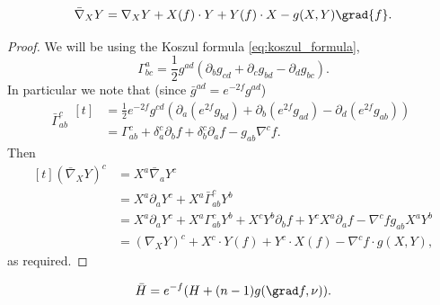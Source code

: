 \documentclass[titlepage,numbers=noenddot,headinclude,oneside,%
footinclude=true,cleardoublepage=empty,%
BCOR=5mm,paper=a4,fontsize=11pt,%
english,%
]{scrartcl}
\begin{document}
\begin{lemma}\label{lem:conformal_change_connection}
    \begin{equation*}
        \bar{\nabla}_X Y =\nabla_X Y+X(f)\cdot Y+Y(f)\cdot X-g(X,Y)\grad{f}.
    \end{equation*}
\end{lemma}
\begin{proof}
    We will be using the Koszul formula \cref{eq:koszul_formula},
    \begin{equation*}
        \Gamma^a_{bc}=\frac{1}{2}g^{ad}(\partial_b g_{cd}+\partial_c g_{bd}-\partial_d g_{bc}).
    \end{equation*}
    In particular we note that (since \( \bar{g}^{ad}=e^{-2f}g^{ad} \))
    \begin{equation*}
        \bar{\Gamma}^c_{ab}\begin{aligned}[t]
            &=\frac{1}{2}e^{-2f}g^{cd}(\partial_a(e^{2f}g_{bd})+\partial_b(e^{2f}g_{ad})-\partial_d(e^{2f}g_{ab}))\\
            &=\Gamma^c_{ab}+\delta^c_a\partial_b f +\delta^c_b\partial_a f-g_{ab}\nabla^c f.
        \end{aligned}
    \end{equation*}
    Then
    \begin{equation*}
        \begin{aligned}[t]
            (\bar{\nabla}_X Y)^c&=X^a \bar{\nabla}_a Y^c\\
            &=X^a \partial_a Y^c + X^a\bar{\Gamma}_{ab}^c  Y^b\\
            &=X^a \partial_a Y^c +X^a \Gamma_{ab}^c Y^b+X^c Y^b \partial_b f+ Y^c X^a \partial_a f-\nabla^c f g_{ab}X^a Y^b\\
            &=(\nabla_X Y)^c+X^c\cdot Y(f)+Y^c\cdot X(f)-\nabla^c f \cdot g(X,Y),
        \end{aligned}
    \end{equation*}
    as required.
\end{proof}
\begin{lemma}\label{lem:mean_curvature_under_conformal_transform}
    \begin{equation*}
        \bar{H}=e^{-f}(H+(n-1) g(\grad f,\nu)).
    \end{equation*}
\end{lemma}
\end{document}

